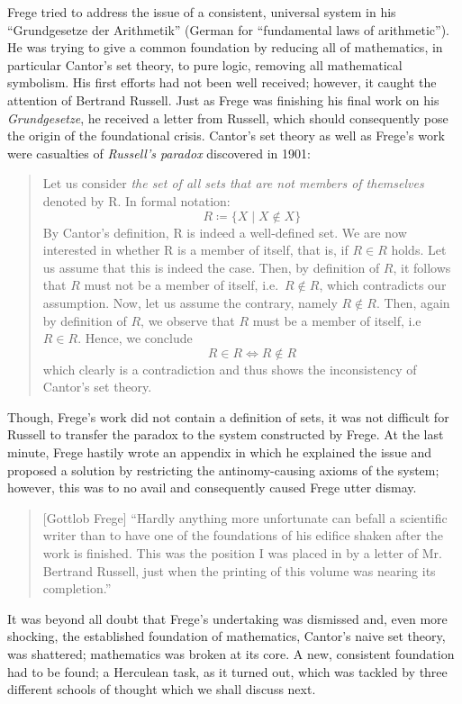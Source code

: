 \documentclass[hidelinks]{article}
\theoremstyle{plain}
\theoremstyle{definition}
\theoremstyle{rem}
\begin{document}
Frege tried to address the issue of a consistent, universal system in his ``Grundgesetze der Arithmetik'' (German for ``fundamental laws of arithmetic''). He was trying to give a common foundation by reducing all of mathematics, in particular Cantor's set theory, to pure logic, removing all mathematical symbolism. His first efforts had not been well received; however, it caught the attention of Bertrand Russell. Just as Frege was finishing his final work on his \textit{Grundgesetze}, he received a letter from Russell, which should consequently pose the origin of the foundational crisis. Cantor's set theory as well as Frege's work were casualties of \textit{Russell's paradox} discovered in 1901:
\begin{quote}
Let us consider \textit{the set of all sets that are not members of themselves} denoted by R. In formal notation:
\begin{equation*}
	R\coloneqq\{X\mid X\notin X\}
\end{equation*}
By Cantor's definition, R is indeed a well-defined set.
We are now interested in whether R is a member of itself, that is, if $R\in R$ holds.
Let us assume that this is indeed the case. Then, by definition of $R$, it follows that $R$ must not be a member of itself, i.e.\ $R\notin R$, which contradicts our assumption. Now, let us assume the contrary, namely $R\notin R$. Then, again by definition of $R$, we observe that $R$ must be a member of itself, i.e\ $R\in R$. Hence, we conclude
\begin{equation*}
		R\in R\iff R\notin R
\end{equation*}
which clearly is a contradiction and thus shows the inconsistency of Cantor's set theory.
\end{quote}
Though, Frege's work did not contain a definition of sets, it was not difficult for Russell to transfer the paradox to the system constructed by Frege. At the last minute, Frege hastily wrote an appendix in which he explained the issue and proposed a solution by restricting the antinomy-causing axioms of the system; however, this was to no avail and consequently caused Frege utter dismay.
\begin{quote}[Gottlob Frege]
``Hardly anything more unfortunate can befall a scientific writer than to have one of the foundations of his edifice shaken after the work is finished. This was the position I was placed in by a letter of Mr. Bertrand Russell, just when the printing of this volume was nearing its completion.''\cite{frege_appendix}
\end{quote}
It was beyond all doubt that Frege's undertaking was dismissed and, even more shocking, the established foundation of mathematics, Cantor's naive set theory, was shattered; mathematics was broken at its core. A new, consistent foundation had to be found; a Herculean task, as it turned out, which was tackled by three different schools of thought which we shall discuss next.
\end{document}
